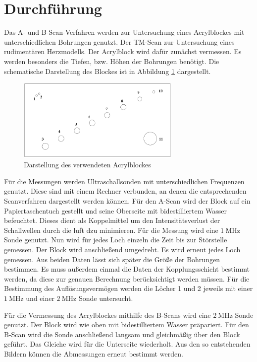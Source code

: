 \section{Durchführung}
\label{sec:Durchführung}

Das A- und B-Scan-Verfahren werden zur Untersuchung eines Acrylblockes mit unterschiedlichen Bohrungen genutzt.
Der TM-Scan zur Untersuchung eines rudimentären Herzmodells.
Der Acrylblock wird dafür zunächst vermessen.
Es werden besonders die Tiefen, bzw. Höhen der Bohrungen benötigt.
Die schematische Darstellung des Blockes ist in Abbildung \ref{fig:kenblock} dargestellt.

\begin{figure}
  \centering
  \includegraphics[width=0.7\textwidth]{images/kenblock.png}
  \caption{Darstellung des verwendeten Acrylblockes}
  \label{fig:kenblock}
\end{figure}

Für die Messungen werden Ultraschallsonden mit unterschiedlichen Frequenzen genutzt.
Diese sind mit einem Rechner verbunden, an denen die entsprechenden Scanverfahren dargestellt werden können.
Für den A-Scan wird der Block auf ein Papiertaschentuch gestellt und seine Oberseite mit bidestilliertem Wasser befeuchtet.
Dieses dient als Koppelmittel um den Intensitätsverlust der Schallwellen durch die luft dzu minimieren.
Für die Messung wird eine $\SI{1}{\mega\hertz}$ Sonde genutzt.
Nun wird für jedes Loch einzeln die Zeit bis zur Störstelle gemessen.
Der Block wird anschließend umgedreht.
Es wird erneut jedes Loch gemessen.
Aus beiden Daten lässt sich später die Größe der Bohrungen bestimmen.
Es muss außerdem einmal die Daten der Kopplungsschicht bestimmt werden, da diese zur genauen Berechnung berücksichtigt werden müssen.
Für die Bestimmung des Auflösungsvermögen werden die Löcher 1 und 2 jeweils mit einer $\SI{1}{\mega\hertz}$ und einer $\SI{2}{\mega\hertz}$ Sonde untersucht.

Für die Vermessung des Acrylblockes mithilfe des B-Scans wird eine $\SI{2}{\mega\hertz}$ Sonde genutzt.
Der Block wird wie oben mit bidestilliertem Wasser präpariert.
Für den B-Scan wird die Sonde anschließend langsam und gleichmäßig über den Block geführt.
Das Gleiche wird für die Unterseite wiederholt.
Aus den so entstehenden Bildern können die Abmessungen erneut bestimmt werden.

